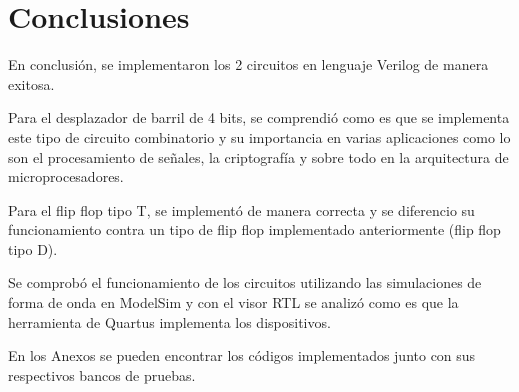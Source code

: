 \section{Conclusiones}
En conclusión, se implementaron los 2 circuitos en lenguaje Verilog de manera exitosa.

Para el desplazador de barril de 4 bits, se comprendió como es que se implementa este tipo de circuito combinatorio y su importancia en varias aplicaciones como lo son el procesamiento de señales, la criptografía y sobre todo en la arquitectura de microprocesadores.

Para el flip flop tipo T, se implementó de manera correcta y se diferencio su funcionamiento contra un tipo de flip flop implementado anteriormente (flip flop tipo D).

Se comprobó el funcionamiento de los circuitos utilizando las simulaciones de forma de onda en ModelSim y con el visor RTL se analizó como es que la herramienta de Quartus implementa los dispositivos.

En los Anexos se pueden encontrar los códigos implementados junto con sus respectivos bancos de pruebas.